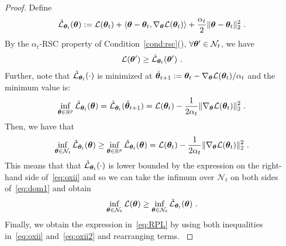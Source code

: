 \begin{proof}
Define 
\begin{equation*}
\hat{{\mathcal{L}}}_{{\bm{\theta}}_t}({\bm{\theta}}) := {\mathcal{L}}({\bm{\theta}}_t) + \langle {\bm{\theta}} - {\bm{\theta}}_t, \nabla_{\bm{\theta}}{\mathcal{L}}({\bm{\theta}}_t) \rangle + \frac{\alpha_t}{2} \| {\bm{\theta}} - {\bm{\theta}}_t \|_2^2 ~.
\end{equation*}
By the $\alpha_t$-RSC property of Condition~\ref{cond:rsc}(), $\forall {\bm{\theta}}' \in \mathcal{N}_t$, we have
\begin{align}
    {\mathcal{L}}({\bm{\theta}}') \geq \hat{{\mathcal{L}}}_{{\bm{\theta}}_t}({\bm{\theta}}')~.
\label{eq:dom1}
\end{align}
Further, note that $\hat{{\mathcal{L}}}_{{\bm{\theta}}_t}(\cdot)$ is minimized at $\hat{{\bm{\theta}}}_{t+1} := {\bm{\theta}}_t - \nabla_{\bm{\theta}}{\mathcal{L}}({\bm{\theta}}_t)/\alpha_t$ and the minimum value is:
\begin{equation*}
    \inf_{{\bm{\theta}}\in{\mathbb{R}}^p} \hat{{\mathcal{L}}}_{{\bm{\theta}}_t}({\bm{\theta}}) = \hat{{\mathcal{L}}}_{{\bm{\theta}}_t}(\hat{{\bm{\theta}}}_{t+1}) = {\mathcal{L}}({\bm{\theta}}_t) - \frac{1}{2\alpha_t} \| \nabla_{\bm{\theta}}{\mathcal{L}}({\bm{\theta}}_t) \|_2^2 ~.
\end{equation*}
%
Then, we have that 
\begin{equation}
\inf_{{\bm{\theta}} \in \mathcal{N}_t} \hat{{\mathcal{L}}}_{{\bm{\theta}}_t} ({\bm{\theta}}) \geq \inf_{{\bm{\theta}}\in{\mathbb{R}}^p} \hat{{\mathcal{L}}}_{{\bm{\theta}}_t}({\bm{\theta}}) = {\mathcal{L}}({\bm{\theta}}_t) - \frac{1}{2\alpha_t} \| \nabla_{\bm{\theta}}{\mathcal{L}}({\bm{\theta}}_t) \|_2^2~.
\label{eq:oxii}
\end{equation}
This means that that $\hat{{\mathcal{L}}}_{{\bm{\theta}}_t}(\cdot)$ is lower bounded by the expression on the right-hand side of~\eqref{eq:oxii} and so we can take the infimum over $\mathcal{N}_t$ on both sides of~\eqref{eq:dom1} and obtain   
\begin{equation}
\inf_{{\bm{\theta}} \in \mathcal{N}_t} {\mathcal{L}}({\bm{\theta}}) \geq \inf_{{\bm{\theta}} \in \mathcal{N}_t} \hat{{\mathcal{L}}}_{{\bm{\theta}}_t} ({\bm{\theta}})~.
\label{eq:oxii2}
\end{equation}
Finally, we obtain the expression in~\eqref{eq:RPL} by using both inequalities in~\eqref{eq:oxii} and~\eqref{eq:oxii2} and rearranging terms. 
%
\label{lemm:QTk} 
\end{proof}

